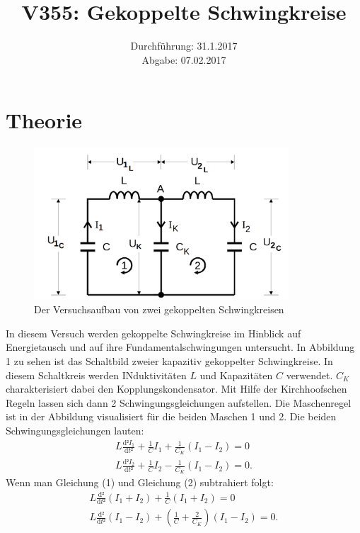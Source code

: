 \documentclass[
  bibliography=totoc,     %
  captions=tableheading,  %
  titlepage=firstiscover, %
]{scrartcl}
\title{V355: Gekoppelte Schwingkreise}
\author{
  Simon Schulte
  \texorpdfstring{
    \\
    \href{mailto:simon.schulte@udo.edu}{simon.schulte@udo.edu}
  }{}
  \texorpdfstring{\and}{, }
  Tim Sedlaczek
  \texorpdfstring{
    \\
    \href{mailto:tim.sedlaczek@udo.edu}{tim.sedlaczek@udo.edu}
  }{}
}
\date{Durchführung: 31.1.2017\\
      Abgabe: 07.02.2017}
\begin{document}
\maketitle
\thispagestyle{empty}
\tableofcontents
\newpage
\section{Theorie}
\label{sec:theorie}
\begin{figure}[htb]
  \centering
  \includegraphics[width=0.85\textwidth]{V3551.png}
  \caption{Der Versuchsaufbau von zwei gekoppelten Schwingkreisen}
  \label{fig:V3551}
\end{figure}
In diesem Versuch werden gekoppelte Schwingkreise im Hinblick auf Energietausch
und auf ihre Fundamentalschwingungen untersucht. In Abbildung 1 zu sehen ist
das Schaltbild zweier kapazitiv gekoppelter Schwingkreise. In diesem Schaltkreis
werden INduktivitäten $L$ und Kapazitäten $C$ verwendet. $C_K$ charakterisiert
dabei den Kopplungskondensator. Mit Hilfe der Kirchhoofschen Regeln lassen
sich dann 2 Schwingungsgleichungen aufstellen. Die Maschenregel ist in der
Abbildung visualisiert für die beiden Maschen 1 und 2. Die beiden
Schwingungsgleichungen lauten:
\begin{align}
  L\frac{\mathup{d}²I_1}{\mathup{d}t²}+\frac{1}{C}I_1+\frac{1}{C_K}(I_1-I_2)=0 \\
  L\frac{\mathup{d}²I_2}{\mathup{d}t²}+\frac{1}{C}I_2-\frac{1}{C_K}(I_1-I_2)=0.
  \label{eqn:schwingungsgleichungen}
\end{align}
Wenn man Gleichung (1) und Gleichung (2) subtrahiert folgt:
\begin{align}
  L\frac{\mathup{d}²}{\mathup{d}t²}(I_1+I_2)+\frac{1}{C}(I_1+I_2)=0 \\
  L\frac{\mathup{d}²}{\mathup{d}t²}(I_1-I_2)+(\frac{1}{C}+\frac{2}{C_K})(I_1-I_2)=0.
\end{align}
\end{document}
